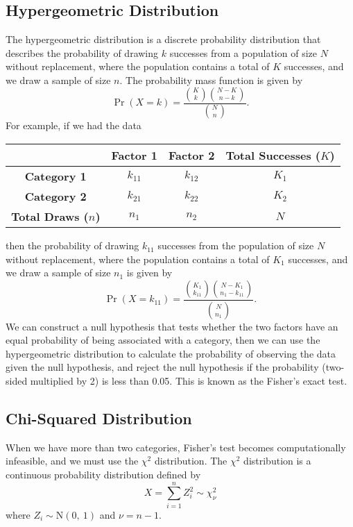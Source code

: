 \documentclass{article}
\begin{document}
\subsection{Hypergeometric Distribution}
The hypergeometric distribution is a discrete probability distribution
that describes the probability of drawing \(k\) successes from a
population of size \(N\) without replacement, where the population
contains a total of \(K\) successes, and we draw a sample of size
\(n\). The probability mass function is given by
\begin{equation*}
    \Pr{\left( X = k \right)} = \frac{\binom{K}{k} \binom{N - K}{n - k}}{\binom{N}{n}}.
\end{equation*}
For example, if we had the data
\begin{table}[H]
    \centering
    \begin{tabular}{c c c c}
        \toprule
                                     & \textbf{Factor 1} & \textbf{Factor 2} & \textbf{Total Successes (\(K\))} \\
        \midrule
        \textbf{Category 1}          & \(k_{11}\)        & \(k_{12}\)        & \(K_1\)                          \\
        \textbf{Category 2}          & \(k_{21}\)        & \(k_{22}\)        & \(K_2\)                          \\
        \textbf{Total Draws (\(n\))} & \(n_1\)           & \(n_2\)           & \(N\)                            \\
        \bottomrule
    \end{tabular}
\end{table}
then the probability of drawing \(k_{11}\) successes from the population of size \(N\) without replacement, where the population contains a total of
\(K_1\) successes, and we draw a sample of size \(n_1\) is given by
\begin{equation*}
    \Pr{\left( X = k_{11} \right)} = \frac{\binom{K_1}{k_{11}} \binom{N - K_1}{n_1 - k_{11}}}{\binom{N}{n_1}}.
\end{equation*}
We can construct a null hypothesis that tests whether the two factors have an equal probability of being
associated with a category, then we can use the hypergeometric distribution to calculate the probability of
observing the data given the null hypothesis, and reject the null hypothesis if the probability (two-sided multiplied by 2)
is less than 0.05. This is known as the Fisher's exact test.
\subsection{Chi-Squared Distribution}
When we have more than two categories, Fisher's test becomes
computationally infeasible, and we must use the \(\chi^2\)
distribution. The \(\chi^2\) distribution is a continuous probability
distribution defined by
\begin{equation*}
    X = \sum_{i = 1}^n Z_i^2 \sim \chi_\nu^2
\end{equation*}
where \(Z_i \sim \mathrm{N}\left( 0,\: 1 \right)\) and \(\nu = n - 1\).
\end{document}
